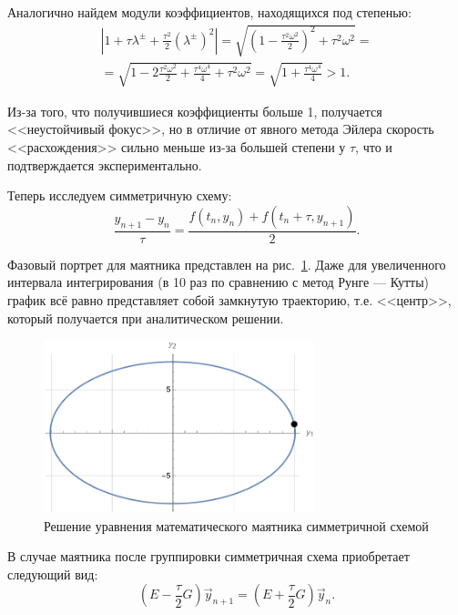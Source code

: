\documentclass[12pt, a4paper]{article}
\begin{document}
	Аналогично найдем модули коэффициентов, находящихся под степенью:
	\begin{gather*}
		\left|1 + \tau \lambda^\pm + \frac{\tau^2}2 (\lambda^\pm)^2\right| = \sqrt{\left(1 - \frac{\tau^2 \omega^2}2\right)^2 + \tau^2 \omega^2} =\\= \sqrt{1 - 2\frac{\tau^2 \omega^2}2 + \frac{\tau^4 \omega^4}4 + \tau^2 \omega^2} 
		= \sqrt{1 + \frac{\tau^4 \omega^4}4} > 1.
	\end{gather*}
	
	Из-за того, что получившиеся коэффициенты больше 1, получается <<неустойчивый фокус>>, но в отличие от явного метода Эйлера скорость <<расхождения>> сильно меньше из-за большей степени у $\tau$, что и подтверждается экспериментально.
	
	Теперь исследуем симметричную схему:
	\begin{equation*}
		\frac{y_{n+1} - y_n}\tau = \frac{f(t_n, y_n) + f(t_n + \tau, y_{n+1})}2.
	\end{equation*}
	
	Фазовый портрет для маятника представлен на рис.~\ref{symml_pend}. Даже для увеличенного интервала интегрирования (в 10 раз по сравнению с метод Рунге --- Кутты) график всё равно представляет собой замкнутую траекторию, т.е. <<центр>>, который получается при аналитическом решении.
	
	\begin{figure}[!h]
		\centering
		\includegraphics[width=0.7\textwidth]{symm_pend}
		\caption{Решение уравнения математического маятника симметричной схемой}
		\label{symml_pend}
	\end{figure}
	
	В случае маятника после группировки симметричная схема приобретает следующий вид:
	\begin{equation*}
		\left(E-\frac\tau2 G\right)\vec{y}_{n+1} = \left(E+\frac\tau2 G\right)\vec{y}_n.
	\end{equation*}
	
\end{document}
